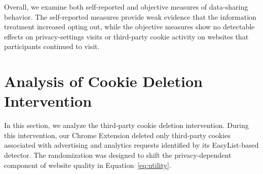 \documentclass[12pt]{article}
\theoremstyle{definition}
\theoremstyle{remark}
\begin{document}
\begin{appendix}
Overall, we examine both self-reported and objective measures of data-sharing behavior. The self-reported measures provide weak evidence that the information treatment increased opting out, while the objective measures show no detectable effects on privacy-settings visits or third-party cookie activity on websites that participants continued to visit.

\begin{table}[ht]
\centering
\caption{Treatment Effect on Within-Website Third-Party Cookies}
\label{tab:cpv_balanced_panel}
\scalebox{0.9}{

}
\caption*{\scriptsize \textsc{Notes}: This table reports PPML difference-in-differences estimates of the treatment effect on third-party cookie activity at the participant--website--day level. Column~(1) uses the number of third-party cookies as the outcome and includes the number of visits as an offset, thereby estimating expected cookie activity per visit. Column~(2) uses the number of unique third-party cookies observed for a participant on a website and day, counting each distinct cookie once within the day. Both specifications retain observed zero-valued outcomes and include participant, website, and calendar-date fixed effects. Standard errors are clustered at the participant level. The table reports PPML coefficients, and the percentage effects discussed in the text are calculated as $100[\exp(\beta)-1]$. Equation~\eqref{eq:data_sharing_did} is estimated on participant--website pairs with recorded browsing activity at least once before and at least once after the intervention. Continuing pairs are defined using the browsing data before cookie outcomes are attached. The restriction retains \cpvBalPairPct\% of participant--website pairs and \cpvBalObsPct\% of browsing observations, covering \cpvBalNUsers{} participants. Cookie measurements are available for \cpvBalCookieCoveragePct\% of the retained browsing observations. The sample covers the information-experiment period and ends before cookie deletion begins.}
\end{table}

\section{Analysis of Cookie Deletion Intervention}\label{subsec:deletion_overall_effects}

In this section, we analyze the third-party cookie deletion intervention. During this intervention, our Chrome Extension deleted only third-party cookies associated with advertising and analytics requests identified by its EasyList-based detector. The randomization was designed to shift the privacy-dependent component of website quality in Equation~\eqref{eq:utility}.


\end{appendix}
\end{document}

